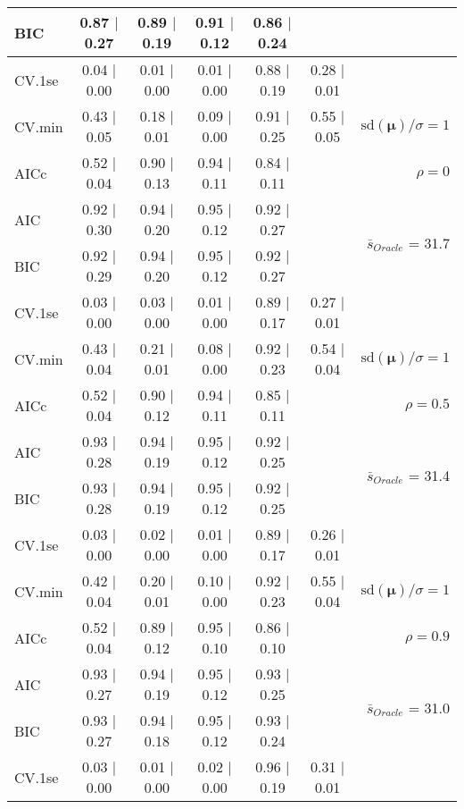 \begin{table}
\begin{center}
\begin{tabular}{l*{5}{c}|r}
BIC & 0.87 $\mid$ 0.27 & 0.89 $\mid$ 0.19 & 0.91 $\mid$ 0.12 & 0.86 $\mid$ 0.24 & &  \\
 \hline 
CV.1se & 0.04 $\mid$ 0.00 & 0.01 $\mid$ 0.00 & 0.01 $\mid$ 0.00 & 0.88 $\mid$ 0.19 & 0.28 $\mid$ 0.01 & \\
CV.min & 0.43 $\mid$ 0.05 & 0.18 $\mid$ 0.01 & 0.09 $\mid$ 0.00 & 0.91 $\mid$ 0.25 & 0.55 $\mid$ 0.05 &  $\mathrm{sd}(\mathbf{\mu})/\sigma=1$ \\
AICc & 0.52 $\mid$ 0.04 & 0.90 $\mid$ 0.13 & 0.94 $\mid$ 0.11 & 0.84 $\mid$ 0.11 & & $\rho=0$ \\
AIC & 0.92 $\mid$ 0.30 & 0.94 $\mid$ 0.20 & 0.95 $\mid$ 0.12 & 0.92 $\mid$ 0.27 & &  \multirow{2}{*}{$\bar{s}_{Oracle}$ = 31.7} \\
BIC & 0.92 $\mid$ 0.29 & 0.94 $\mid$ 0.20 & 0.95 $\mid$ 0.12 & 0.92 $\mid$ 0.27 & &  \\
 \hline 
CV.1se & 0.03 $\mid$ 0.00 & 0.03 $\mid$ 0.00 & 0.01 $\mid$ 0.00 & 0.89 $\mid$ 0.17 & 0.27 $\mid$ 0.01 & \\
CV.min & 0.43 $\mid$ 0.04 & 0.21 $\mid$ 0.01 & 0.08 $\mid$ 0.00 & 0.92 $\mid$ 0.23 & 0.54 $\mid$ 0.04 &  $\mathrm{sd}(\mathbf{\mu})/\sigma=1$ \\
AICc & 0.52 $\mid$ 0.04 & 0.90 $\mid$ 0.12 & 0.94 $\mid$ 0.11 & 0.85 $\mid$ 0.11 & & $\rho=0.5$ \\
AIC & 0.93 $\mid$ 0.28 & 0.94 $\mid$ 0.19 & 0.95 $\mid$ 0.12 & 0.92 $\mid$ 0.25 & &  \multirow{2}{*}{$\bar{s}_{Oracle}$ = 31.4} \\
BIC & 0.93 $\mid$ 0.28 & 0.94 $\mid$ 0.19 & 0.95 $\mid$ 0.12 & 0.92 $\mid$ 0.25 & &  \\
 \hline 
CV.1se & 0.03 $\mid$ 0.00 & 0.02 $\mid$ 0.00 & 0.01 $\mid$ 0.00 & 0.89 $\mid$ 0.17 & 0.26 $\mid$ 0.01 & \\
CV.min & 0.42 $\mid$ 0.04 & 0.20 $\mid$ 0.01 & 0.10 $\mid$ 0.00 & 0.92 $\mid$ 0.23 & 0.55 $\mid$ 0.04 &  $\mathrm{sd}(\mathbf{\mu})/\sigma=1$ \\
AICc & 0.52 $\mid$ 0.04 & 0.89 $\mid$ 0.12 & 0.95 $\mid$ 0.10 & 0.86 $\mid$ 0.10 & & $\rho=0.9$ \\
AIC & 0.93 $\mid$ 0.27 & 0.94 $\mid$ 0.19 & 0.95 $\mid$ 0.12 & 0.93 $\mid$ 0.25 & &  \multirow{2}{*}{$\bar{s}_{Oracle}$ = 31.0} \\
BIC & 0.93 $\mid$ 0.27 & 0.94 $\mid$ 0.18 & 0.95 $\mid$ 0.12 & 0.93 $\mid$ 0.24 & &  \\
 \hline 
CV.1se & 0.03 $\mid$ 0.00 & 0.01 $\mid$ 0.00 & 0.02 $\mid$ 0.00 & 0.96 $\mid$ 0.19 & 0.31 $\mid$ 0.01 & \\

\end{tabular}
\end{center}
\end{table}

